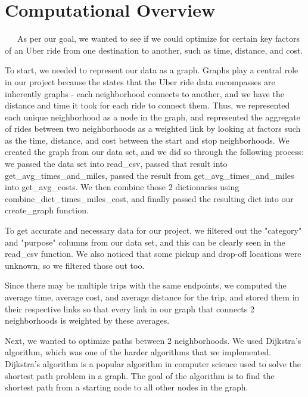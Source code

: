 \documentclass[fontsize=11pt]{article}
\begin{document}
\section*{Computational Overview}

\ \ \ As per our goal, we wanted to see if we could optimize for certain key factors of an Uber ride from one destination to another, such as time, distance, and cost. \newline

To start, we needed to represent our data as a graph. Graphs play a central role in our project because the states that the Uber ride data encompasses are inherently graphs - each neighborhood connects to another, and we have the distance and time it took for each ride to connect them. Thus, we represented each unique neighborhood as a node in the graph, and represented the aggregate of rides between two neighborhoods as a weighted link by looking at factors such as the time, distance, and cost between the start and stop neighborhoods. We created the graph from our data set, and we did so through the following process: we passed the data set into read\_csv, passed that result into get\_avg\_times\_and\_miles, passed the result from get\_avg\_times\_and\_miles into get\_avg\_costs. We then combine those 2 dictionaries using combine\_dict\_times\_miles\_cost, and finally passed the resulting dict into our create\_graph function. \newline

To get accurate and necessary data for our project, we filtered out the "category" and "purpose" columns from our data set, and this can be clearly seen in the read\_csv function. We also noticed that some pickup and drop-off locations were unknown, so we filtered those out too. \newline

Since there may be multiple trips with the same endpoints, we computed the average time, average cost, and average distance for the trip, and stored them in their respective links so that every link in our graph that connects 2 neighborhoods is weighted by these averages. \newline

Next, we wanted to optimize paths between 2 neighborhoods. We used Dijkstra's algorithm, which was one of the harder algorithms that we implemented. Dijkstra's algorithm is a popular algorithm in computer science used to solve the shortest path problem in a graph. The goal of the algorithm is to find the shortest path from a starting node to all other nodes in the graph. \newline
\end{document}
